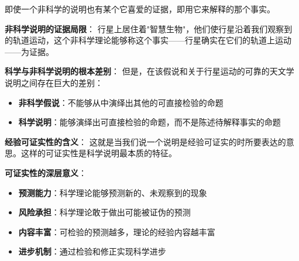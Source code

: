 \begin{theorembox}[title=可证实性：科学说明的本质特征]
即使一个非科学的说明也有某个它喜爱的证据，即用它来解释的那个事实。

\textbf{非科学说明的证据局限}：
行星上居住着"智慧生物"，他们使行星沿着我们观察到的轨道运动，这个非科学理论能够称这个事实——行星确实在它们的轨道上运动——为证据。

\textbf{科学与非科学说明的根本差别}：
但是，在该假说和关于行星运动的可靠的天文学说明之间存在巨大的差别：
\begin{itemize}
\item \textbf{非科学假说}：不能够从中演绎出其他的可直接检验的命题
\item \textbf{科学说明}：能够演绎出可直接检验的命题，而不是陈述待解释事实的命题
\end{itemize}

\textbf{经验可证实性的含义}：
这就是当我们说一个说明是经验可证实的时所要表达的意思。这样的可证实性是科学说明最本质的特征。\cite{popper1935}

\textbf{可证实性的深层意义}：
\begin{itemize}
\item \textbf{预测能力}：科学理论能够预测新的、未观察到的现象
\item \textbf{风险承担}：科学理论敢于做出可能被证伪的预测
\item \textbf{内容丰富}：可检验的预测越多，理论的经验内容越丰富
\item \textbf{进步机制}：通过检验和修正实现科学进步
\end{itemize}
\end{theorembox}

